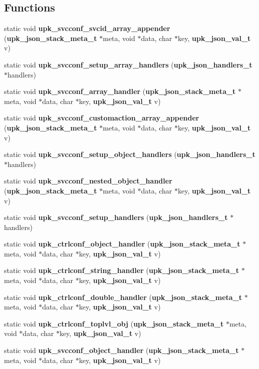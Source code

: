 \subsection*{Functions}
\begin{DoxyCompactItemize}
\item 
static void {\bf upk\_\-svcconf\_\-svcid\_\-array\_\-appender} ({\bf upk\_\-json\_\-stack\_\-meta\_\-t} $\ast$meta, void $\ast$data, char $\ast$key, {\bf upk\_\-json\_\-val\_\-t} v)
\item 
static void {\bf upk\_\-svcconf\_\-setup\_\-array\_\-handlers} ({\bf upk\_\-json\_\-handlers\_\-t} $\ast$handlers)
\item 
static void {\bf upk\_\-svcconf\_\-array\_\-handler} ({\bf upk\_\-json\_\-stack\_\-meta\_\-t} $\ast$meta, void $\ast$data, char $\ast$key, {\bf upk\_\-json\_\-val\_\-t} v)
\item 
static void {\bf upk\_\-svcconf\_\-customaction\_\-array\_\-appender} ({\bf upk\_\-json\_\-stack\_\-meta\_\-t} $\ast$meta, void $\ast$data, char $\ast$key, {\bf upk\_\-json\_\-val\_\-t} v)
\item 
static void {\bf upk\_\-svcconf\_\-setup\_\-object\_\-handlers} ({\bf upk\_\-json\_\-handlers\_\-t} $\ast$handlers)
\item 
static void {\bf upk\_\-svcconf\_\-nested\_\-object\_\-handler} ({\bf upk\_\-json\_\-stack\_\-meta\_\-t} $\ast$meta, void $\ast$data, char $\ast$key, {\bf upk\_\-json\_\-val\_\-t} v)
\item 
static void {\bf upk\_\-svcconf\_\-setup\_\-handlers} ({\bf upk\_\-json\_\-handlers\_\-t} $\ast$handlers)
\item 
static void {\bf upk\_\-ctrlconf\_\-object\_\-handler} ({\bf upk\_\-json\_\-stack\_\-meta\_\-t} $\ast$meta, void $\ast$data, char $\ast$key, {\bf upk\_\-json\_\-val\_\-t} v)
\item 
static void {\bf upk\_\-ctrlconf\_\-string\_\-handler} ({\bf upk\_\-json\_\-stack\_\-meta\_\-t} $\ast$meta, void $\ast$data, char $\ast$key, {\bf upk\_\-json\_\-val\_\-t} v)
\item 
static void {\bf upk\_\-ctrlconf\_\-double\_\-handler} ({\bf upk\_\-json\_\-stack\_\-meta\_\-t} $\ast$meta, void $\ast$data, char $\ast$key, {\bf upk\_\-json\_\-val\_\-t} v)
\item 
static void {\bf upk\_\-ctrlconf\_\-toplvl\_\-obj} ({\bf upk\_\-json\_\-stack\_\-meta\_\-t} $\ast$meta, void $\ast$data, char $\ast$key, {\bf upk\_\-json\_\-val\_\-t} v)
\item 
static void {\bf upk\_\-svcconf\_\-object\_\-handler} ({\bf upk\_\-json\_\-stack\_\-meta\_\-t} $\ast$meta, void $\ast$data, char $\ast$key, {\bf upk\_\-json\_\-val\_\-t} v)

\end{DoxyCompactItemize}
